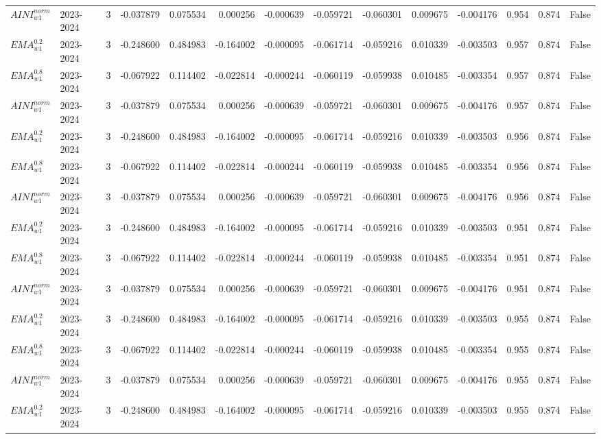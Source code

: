 \begin{tabular}{@{}llrrrrrrrrrlll@{}}
$AINI^{norm}_{w1}$ & 2023-2024 & 3 & -0.037879 & 0.075534 & 0.000256 & -0.000639 & -0.059721 & -0.060301 & 0.009675 & -0.004176 & 0.954 & 0.874 & False \\
$EMA^{0.2}_{w1}$ & 2023-2024 & 3 & -0.248600 & 0.484983 & -0.164002 & -0.000095 & -0.061714 & -0.059216 & 0.010339 & -0.003503 & 0.957 & 0.874 & False \\
$EMA^{0.8}_{w1}$ & 2023-2024 & 3 & -0.067922 & 0.114402 & -0.022814 & -0.000244 & -0.060119 & -0.059938 & 0.010485 & -0.003354 & 0.957 & 0.874 & False \\
$AINI^{norm}_{w1}$ & 2023-2024 & 3 & -0.037879 & 0.075534 & 0.000256 & -0.000639 & -0.059721 & -0.060301 & 0.009675 & -0.004176 & 0.957 & 0.874 & False \\
$EMA^{0.2}_{w1}$ & 2023-2024 & 3 & -0.248600 & 0.484983 & -0.164002 & -0.000095 & -0.061714 & -0.059216 & 0.010339 & -0.003503 & 0.956 & 0.874 & False \\
$EMA^{0.8}_{w1}$ & 2023-2024 & 3 & -0.067922 & 0.114402 & -0.022814 & -0.000244 & -0.060119 & -0.059938 & 0.010485 & -0.003354 & 0.956 & 0.874 & False \\
$AINI^{norm}_{w1}$ & 2023-2024 & 3 & -0.037879 & 0.075534 & 0.000256 & -0.000639 & -0.059721 & -0.060301 & 0.009675 & -0.004176 & 0.956 & 0.874 & False \\
$EMA^{0.2}_{w1}$ & 2023-2024 & 3 & -0.248600 & 0.484983 & -0.164002 & -0.000095 & -0.061714 & -0.059216 & 0.010339 & -0.003503 & 0.951 & 0.874 & False \\
$EMA^{0.8}_{w1}$ & 2023-2024 & 3 & -0.067922 & 0.114402 & -0.022814 & -0.000244 & -0.060119 & -0.059938 & 0.010485 & -0.003354 & 0.951 & 0.874 & False \\
$AINI^{norm}_{w1}$ & 2023-2024 & 3 & -0.037879 & 0.075534 & 0.000256 & -0.000639 & -0.059721 & -0.060301 & 0.009675 & -0.004176 & 0.951 & 0.874 & False \\
$EMA^{0.2}_{w1}$ & 2023-2024 & 3 & -0.248600 & 0.484983 & -0.164002 & -0.000095 & -0.061714 & -0.059216 & 0.010339 & -0.003503 & 0.955 & 0.874 & False \\
$EMA^{0.8}_{w1}$ & 2023-2024 & 3 & -0.067922 & 0.114402 & -0.022814 & -0.000244 & -0.060119 & -0.059938 & 0.010485 & -0.003354 & 0.955 & 0.874 & False \\
$AINI^{norm}_{w1}$ & 2023-2024 & 3 & -0.037879 & 0.075534 & 0.000256 & -0.000639 & -0.059721 & -0.060301 & 0.009675 & -0.004176 & 0.955 & 0.874 & False \\
$EMA^{0.2}_{w1}$ & 2023-2024 & 3 & -0.248600 & 0.484983 & -0.164002 & -0.000095 & -0.061714 & -0.059216 & 0.010339 & -0.003503 & 0.955 & 0.874 & False \\

\end{tabular}
